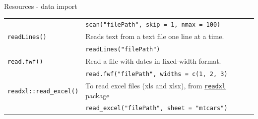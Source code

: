 \documentclass[9pt,ignorenonframetext,]{beamer}
\begin{document}
\begin{frame}[fragile]{Resources - data import}
\begin{longtable}[]{@{}ll@{}}
\begin{minipage}[t]{0.25\columnwidth}\raggedright\strut
\strut
\end{minipage} & \begin{minipage}[t]{0.69\columnwidth}\raggedright\strut
\texttt{scan("filePath",\ skip\ =\ 1,\ nmax\ =\ 100)}\strut
\end{minipage}\tabularnewline
\begin{minipage}[t]{0.25\columnwidth}\raggedright\strut
\texttt{readLines()}\strut
\end{minipage} & \begin{minipage}[t]{0.69\columnwidth}\raggedright\strut
Reads text from a text file one line at a time.\strut
\end{minipage}\tabularnewline
\begin{minipage}[t]{0.25\columnwidth}\raggedright\strut
\strut
\end{minipage} & \begin{minipage}[t]{0.69\columnwidth}\raggedright\strut
\texttt{readLines("filePath")}\strut
\end{minipage}\tabularnewline
\begin{minipage}[t]{0.25\columnwidth}\raggedright\strut
\texttt{read.fwf()}\strut
\end{minipage} & \begin{minipage}[t]{0.69\columnwidth}\raggedright\strut
Read a file with dates in fixed-width format.\strut
\end{minipage}\tabularnewline
\begin{minipage}[t]{0.25\columnwidth}\raggedright\strut
\strut
\end{minipage} & \begin{minipage}[t]{0.69\columnwidth}\raggedright\strut
\texttt{read.fwf("filePath",\ widths\ =\ c(1,\ 2,\ 3)}\strut
\end{minipage}\tabularnewline
\begin{minipage}[t]{0.25\columnwidth}\raggedright\strut
\texttt{readxl::read\_excel()}\strut
\end{minipage} & \begin{minipage}[t]{0.69\columnwidth}\raggedright\strut
To read excel files (xls and xlsx), from
\href{https://cran.r-project.org/web/packages/readxl/index.html}{\texttt{readxl}}
package\strut
\end{minipage}\tabularnewline
\begin{minipage}[t]{0.25\columnwidth}\raggedright\strut
\strut
\end{minipage} & \begin{minipage}[t]{0.69\columnwidth}\raggedright\strut
\texttt{read\_excel("filePath",\ sheet\ =\ "mtcars")}\strut
\end{minipage}\tabularnewline
\bottomrule
\end{longtable}

\end{frame}
\end{document}
